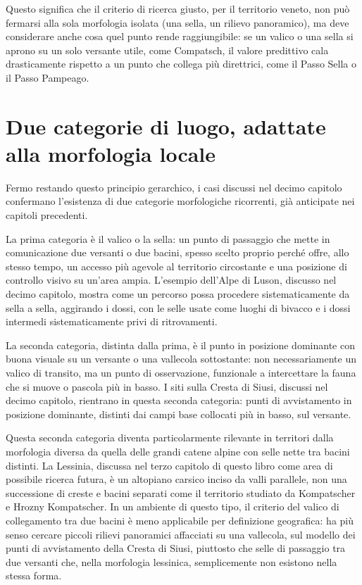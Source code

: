 Questo significa che il criterio di ricerca giusto, per il territorio veneto, non può fermarsi alla sola morfologia isolata (una sella, un rilievo panoramico), ma deve considerare anche cosa quel punto rende raggiungibile: se un valico o una sella si aprono su un solo versante utile, come Compatsch, il valore predittivo cala drasticamente rispetto a un punto che collega più direttrici, come il Passo Sella o il Passo Pampeago.

\section{Due categorie di luogo, adattate alla morfologia locale}

Fermo restando questo principio gerarchico, i casi discussi nel decimo capitolo confermano l'esistenza di due categorie morfologiche ricorrenti, già anticipate nei capitoli precedenti.

La prima categoria è il valico o la sella: un punto di passaggio che mette in comunicazione due versanti o due bacini, spesso scelto proprio perché offre, allo stesso tempo, un accesso più agevole al territorio circostante e una posizione di controllo visivo su un'area ampia. L'esempio dell'Alpe di Luson, discusso nel decimo capitolo, mostra come un percorso possa procedere sistematicamente da sella a sella, aggirando i dossi, con le selle usate come luoghi di bivacco e i dossi intermedi sistematicamente privi di ritrovamenti.

La seconda categoria, distinta dalla prima, è il punto in posizione dominante con buona visuale su un versante o una vallecola sottostante: non necessariamente un valico di transito, ma un punto di osservazione, funzionale a intercettare la fauna che si muove o pascola più in basso. I siti sulla Cresta di Siusi, discussi nel decimo capitolo, rientrano in questa seconda categoria: punti di avvistamento in posizione dominante, distinti dai campi base collocati più in basso, sul versante.

Questa seconda categoria diventa particolarmente rilevante in territori dalla morfologia diversa da quella delle grandi catene alpine con selle nette tra bacini distinti. La Lessinia, discussa nel terzo capitolo di questo libro come area di possibile ricerca futura, è un altopiano carsico inciso da valli parallele, non una successione di creste e bacini separati come il territorio studiato da Kompatscher e Hrozny Kompatscher. In un ambiente di questo tipo, il criterio del valico di collegamento tra due bacini è meno applicabile per definizione geografica: ha più senso cercare piccoli rilievi panoramici affacciati su una vallecola, sul modello dei punti di avvistamento della Cresta di Siusi, piuttosto che selle di passaggio tra due versanti che, nella morfologia lessinica, semplicemente non esistono nella stessa forma.

